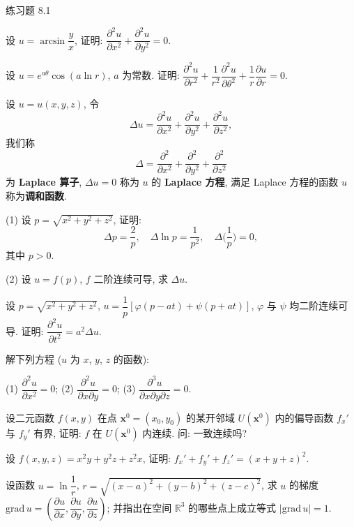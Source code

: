 \begin{exblock}{练习题 8.1}
  \item 设 $u = \arcsin\dfrac{y}{x}$, 证明: $\dfrac{\partial^{2}u}{\partial x^{2}} + \dfrac{\partial^{2}u}{\partial y^{2}} = 0$.

  \item 设 $u = e^{a\theta}\cos(a\ln r)$, $a$ 为常数. 证明: $\dfrac{\partial^{2}u}{\partial r^{2}} + \dfrac{1}{r^{2}}\dfrac{\partial^{2}u}{\partial \theta^{2}} + \dfrac{1}{r}\dfrac{\partial u}{\partial r} = 0$.

  \item 设 $u = u(x, y, z)$, 令
  \[
    \Delta u = \frac{\partial^{2}u}{\partial x^{2}} + \frac{\partial^{2}u}{\partial y^{2}} + \frac{\partial^{2}u}{\partial z^{2}},
  \]
  我们称
  \[
    \Delta = \frac{\partial^{2}}{\partial x^{2}} + \frac{\partial^{2}}{\partial y^{2}} + \frac{\partial^{2}}{\partial z^{2}}
  \]
  为 \textbf{Laplace 算子}, $\Delta u = 0$ 称为 $u$ 的 \textbf{Laplace 方程}, 满足 Laplace 方程的函数 $u$ 称为\textbf{调和函数}.

  (1) 设 $p = \sqrt{x^{2} + y^{2} + z^{2}}$, 证明:
  \[
    \Delta p = \frac{2}{p}, \quad \Delta\ln p = \frac{1}{p^{2}}, \quad \Delta\Big(\frac{1}{p}\Big) = 0,
  \]
  其中 $p > 0$.

  (2) 设 $u = f(p)$, $f$ 二阶连续可导, 求 $\Delta u$.

  \item 设 $p = \sqrt{x^{2} + y^{2} + z^{2}}$, $u = \dfrac{1}{p}\left[\varphi(p - at) + \psi(p + at)\right]$, $\varphi$ 与 $\psi$ 均二阶连续可导. 证明: $\dfrac{\partial^{2}u}{\partial t^{2}} = a^{2}\Delta u$.

  \item 解下列方程 ($u$ 为 $x$, $y$, $z$ 的函数):

  (1) $\dfrac{\partial^{2}u}{\partial x^{2}} = 0$; \quad (2) $\dfrac{\partial^{2}u}{\partial x\partial y} = 0$; \quad (3) $\dfrac{\partial^{3}u}{\partial x\partial y\partial z} = 0$.

  \item 设二元函数 $f(x, y)$ 在点 $\boldsymbol{x}^{0} = (x_{0}, y_{0})$ 的某开邻域 $U(\boldsymbol{x}^{0})$ 内的偏导函数 $f_{x}'$ 与 $f_{y}'$ 有界, 证明: $f$ 在 $U(\boldsymbol{x}^{0})$ 内连续. 问: 一致连续吗?

  \item 设 $f(x, y, z) = x^{2}y + y^{2}z + z^{2}x$, 证明: $f_{x}' + f_{y}' + f_{z}' = (x + y + z)^{2}$.

  \item 设函数 $u = \ln\dfrac{1}{r}$, $r = \sqrt{(x - a)^{2} + (y - b)^{2} + (z - c)^{2}}$, 求 $u$ 的梯度 $\mathrm{grad}\,u = \left(\dfrac{\partial u}{\partial x}, \dfrac{\partial u}{\partial y}, \dfrac{\partial u}{\partial z}\right)$; 并指出在空间 $\mathbb{R}^{3}$ 的哪些点上成立等式 $|\mathrm{grad}\,u| = 1$.


\end{exblock}
